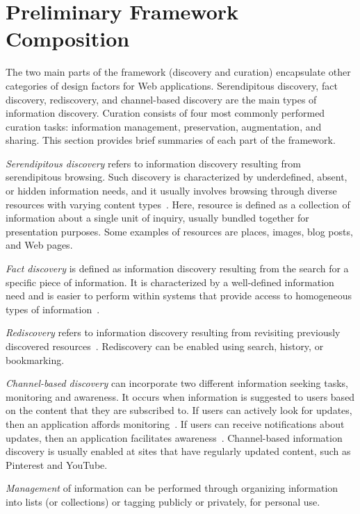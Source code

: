 {\section{Preliminary Framework Composition}
The two main parts of the framework (discovery and curation) encapsulate other categories of design factors for Web applications. Serendipitous discovery, fact discovery, rediscovery, and channel-based discovery are the main types of information discovery. Curation consists of four most commonly performed curation tasks: information management, preservation, augmentation, and sharing. This section provides brief summaries of each part of the framework.

\textit{Serendipitous discovery} refers to information discovery resulting from serendipitous browsing. Such discovery is characterized by underdefined, absent, or hidden information needs, and it usually involves browsing through diverse resources with varying content types~\cite{kellar2006goal, kellar2007field}. Here, resource is defined as a collection of information about a single unit of inquiry, usually bundled together for presentation purposes. Some examples of resources are places, images, blog posts, and Web pages. 

\textit{Fact discovery} is defined as information discovery resulting from the search for a specific piece of information. It is characterized by a well-defined information need and is easier to perform within systems that provide access to homogeneous types of information~\cite{kellar2006goal, lindley2012s}.

\textit{Rediscovery} refers to information discovery resulting from revisiting previously discovered resources~\cite{tauscher1997people}. Rediscovery can be enabled using search, history, or bookmarking.

\textit{Channel-based discovery} can incorporate two different information seeking tasks, monitoring and awareness. It occurs when information is suggested to users based on the content that they are subscribed to. If users can actively look for updates, then an application affords monitoring~\cite{morrison2001taxonomic}. If users can receive notifications about updates, then an application facilitates awareness~\cite{bates1986exploratory,bates2002toward}. Channel-based information discovery is usually enabled at sites that have regularly updated content, such as Pinterest and YouTube.    

\textit{Management} of information can be performed through organizing information into lists (or collections) or tagging publicly or privately, for personal use.  

}
